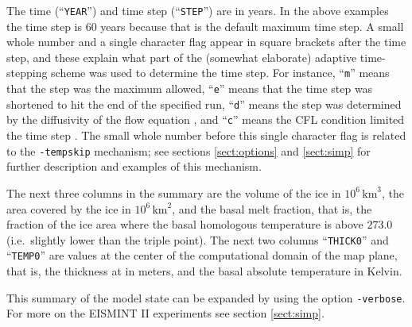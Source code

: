\documentclass[12pt,final]{amsart}
\renewcommand{\t}[1]{\texttt{#1}}
\begin{document}
The time (``\t{YEAR}'') and time step (``\t{STEP}'') are in years.  In the above examples the time step is 60 years because that is the default maximum time step.  A small whole number and a single character flag appear in square brackets after the time step, and these explain what part of the (somewhat elaborate) adaptive time-stepping scheme was used to determine the time step.  For instance, ``\t{m}'' means that the step was the maximum allowed, ``\t{e}'' means that the time step was shortened to hit the end of the specified run, ``\t{d}'' means the step was determined by the diffusivity of the flow equation \cite{BBL}, and ``\t{c}'' means the CFL condition limited the time step \cite{BBL,MortonMayers}.  The small whole number before this single character flag is related to the \verb|-tempskip| mechanism; see sections \ref{sect:options} and \ref{sect:simp} for further description and examples of this mechanism.

The next three columns in the summary are the volume of the ice in $10^6 \,\text{km}^3$, the area covered by the ice in $10^6\,\text{km}^2$, and the basal melt fraction, that is, the fraction of the ice area where the basal homologous temperature is above $273.0$ (i.e.~slightly lower than the triple point).  The next two columns ``\texttt{THICK0}'' and ``\texttt{TEMP0}'' are values at the center of the computational domain of the map plane, that is, the thickness at in meters, and the basal absolute temperature in Kelvin.

This summary of the model state can be expanded by using the option \verb|-verbose|.  For more on the EISMINT II experiments see section \ref{sect:simp}.
\end{document}

